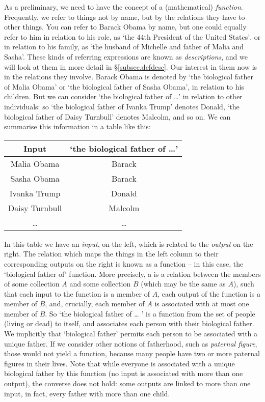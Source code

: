 As a preliminary, we need to have the concept of a (mathematical) \emph{function}. Frequently, we refer to things not by name, but by the relations they have to other things. You can refer to Barack Obama by name, but one could equally refer to him in relation to his role, as `the 44th President of the United States', or in relation to his family, as `the husband of Michelle and father of Malia and Sasha'. These kinds of referring expressions are known as \emph{descriptions}, and we will look at them in more detail in §\ref{subsec.defdesc}. Our interest in them now is in the relations they involve. Barack Obama is denoted by `the biological father of Malia Obama' or `the biological father of Sasha Obama', in relation to his children. But we can consider `the biological father of …' in relation to other individuals: so `the biological father of Ivanka Trump' denotes Donald, `the biological father of Daisy Turnbull' denotes Malcolm, and so on. We can summarise this information in a table like this: 
\begin{center}
\begin{tabular}{c|c} \toprule 
Input & `the biological father of …'\\
\midrule
Malia Obama & Barack \\
Sasha Obama & Barack \\
Ivanka Trump & Donald\\
Daisy Turnbull & Malcolm\\
… & … \\ \bottomrule
\end{tabular}
\end{center} In this table we have an \emph{input}, on the left, which is related to the \emph{output} on the right. The relation which maps the things in the left column to their corresponding outputs on the right is known as a function – in this case, the `biological father of' function. More precisely, a  is a relation between the members of some collection $A$ and some collection $B$ (which may be the same as $A$), such that each input to the function is a member of $A$, each output of the function is a member of $B$, and, crucially, each member of $A$ is associated with at most one member of $B$. So `the biological father of … ' is a function from the set of people (living or dead) to itself, and associates each person with their biological father. We implicitly that `biological father' permits each person to be associated with a unique father. If we consider other notions of fatherhood, such as \emph{paternal figure}, those would not yield a function, because many people have two or more paternal figures in their lives. Note that while everyone is associated with a unique biological father by this function (no input is associated with more than one output), the converse does not hold: some outputs are linked to more than one input, in fact, every father with more than one child.


